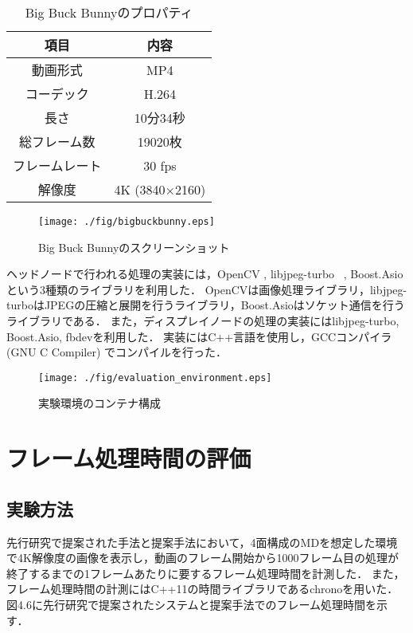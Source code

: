 \begin{table}[htbp]
    \caption{Big Buck Bunnyのプロパティ}
    \begin{center}
    \begin{tabular}{cc}
    \hline
    項目 & 内容 \\\hline\hline
    動画形式　& MP4 \\ \hline
    コーデック & H.264 \cite{h264} \\ \hline
    長さ & 10分34秒 \\ \hline
    総フレーム数 & 19020枚 \\ \hline
    フレームレート & 30 fps \\ \hline
    解像度 & 4K (3840×2160) \\ \hline

    \end{tabular}
    \end{center}
\end{table}

\begin{figure}[H]
    \hspace*{\fill}
    \texttt{[image: ./fig/bigbuckbunny.eps]}
    \hspace*{\fill}
    \caption{Big Buck Bunnyのスクリーンショット}
   \end{figure}

ヘッドノードで行われる処理の実装には，OpenCV \cite{opencv}, libjpeg-turbo ~\cite{libjpeg}, Boost.Asio \cite{asio}という3種類のライブラリを利用した． 
OpenCVは画像処理ライブラリ，libjpeg-turboはJPEGの圧縮と展開を行うライブラリ，Boost.Asioはソケット通信を行うライブラリである．
また，ディスプレイノードの処理の実装にはlibjpeg-turbo, Boost.Asio, fbdevを利用した．
実装にはC++言語を使用し，GCCコンパイラ (GNU C Compiler) \cite{gcc}でコンパイルを行った．

\begin{figure}[H]
    \hspace*{\fill}
    \texttt{[image: ./fig/evaluation\_environment.eps]}
    \hspace*{\fill}
    \caption{実験環境のコンテナ構成}
   \end{figure}

\section{フレーム処理時間の評価}

\subsection{実験方法}
先行研究で提案された手法と提案手法において，4面構成のMDを想定した環境で4K解像度の画像を表示し，動画のフレーム開始から1000フレーム目の処理が終了するまでの1フレームあたりに要するフレーム処理時間を計測した．
また，フレーム処理時間の計測にはC++11の時間ライブラリであるchronoを用いた．
図4.6に先行研究で提案されたシステムと提案手法でのフレーム処理時間を示す．

